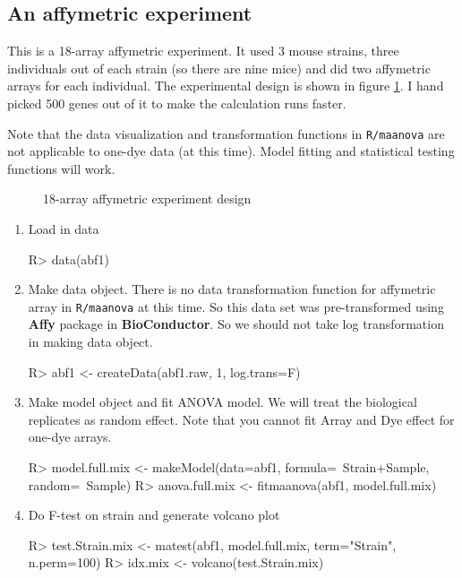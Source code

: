\subsection{An affymetric experiment}
This is a 18-array affymetric experiment. 
It used 3 mouse strains, three individuals
out of each strain (so there are nine mice) and did two
affymetric arrays for each individual. The experimental
design is shown in figure \ref{fig:abf1}. I hand picked
500 genes out of it to make the calculation runs faster.

Note that the data visualization and transformation
functions in {\tt R/maanova} are not
applicable to one-dye data (at this time). Model fitting
and statistical testing functions will work.

\begin{figure}[htbp]
\centering
\caption{18-array affymetric experiment design}
\label{fig:abf1}
\end{figure}


\begin{enumerate}
\item Load in data \\
\begin{Sinput}
R> data(abf1)
\end{Sinput}

\item Make data object. There is no data transformation function
for affymetric array in {\tt R/maanova} at this time. So this
data set was pre-transformed using {\bf Affy} package in 
{\bf BioConductor}. So we should not take log transformation
in making data object.
\begin{Sinput}
R> abf1 <- createData(abf1.raw, 1, log.trans=F)
\end{Sinput}

\item Make model object and fit ANOVA model. We will treat 
the biological replicates as random effect.
Note that you cannot fit Array and Dye effect
for one-dye arrays.
\begin{Sinput}
R> model.full.mix <- makeModel(data=abf1, formula=~Strain+Sample, 
       random=~Sample)
R> anova.full.mix <- fitmaanova(abf1, model.full.mix)
\end{Sinput}

\item Do F-test on strain and generate volcano plot
\begin{Sinput}
R> test.Strain.mix <- matest(abf1, model.full.mix, term="Strain", 
          n.perm=100)
R> idx.mix <- volcano(test.Strain.mix)
\end{Sinput}

\end{enumerate}

